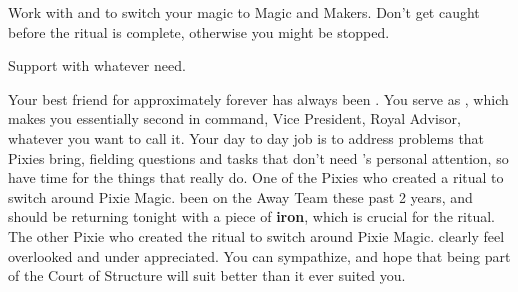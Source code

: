 \documentclass[char]{PP}
\begin{document}
\begin{itemz}
	\item Work with \cMChange{} and \cFWanabe{} to switch your magic to Magic and Makers. Don't get caught before the ritual is complete, otherwise you might be stopped.
	\item Support \cSHead{} with whatever \cSHead{\they} need\cSHead{\verbs}.
\end{itemz}

\begin{itemz}[Notes]
	\item 
\end{itemz}

\begin{contacts}
	\contact{\cSHead{}} Your best friend for approximately forever has always been \cSHead{}. You serve as \cSHead{\Their} \cSAdvisor{\heir}, which makes you essentially \cSHead{\their} second in command, Vice President, Royal Advisor, whatever you want to call it. Your day to day job is to address problems that Pixies bring, fielding questions and tasks that don't need \cSHead{}'s personal attention, so \cSHead{\they} have time for the things that really do.
	\contact{\cMChange{}}  One of the Pixies who created a ritual to switch around Pixie Magic. \cMChange{\They} \cMChange{\have} been on the Away Team these past 2 years, and should be returning tonight with a piece of \textbf{iron}, which is crucial for the ritual.
	\contact{\cFWanabe{}} The other Pixie who created the ritual to switch around Pixie Magic. \cFWanabe{\They} clearly feel\cFWanabe{\verbs} overlooked and under appreciated. You can sympathize, and hope that being part of the Court of Structure will suit \cFWanabe{} better than it ever suited you.
\end{contacts}
\end{document}
